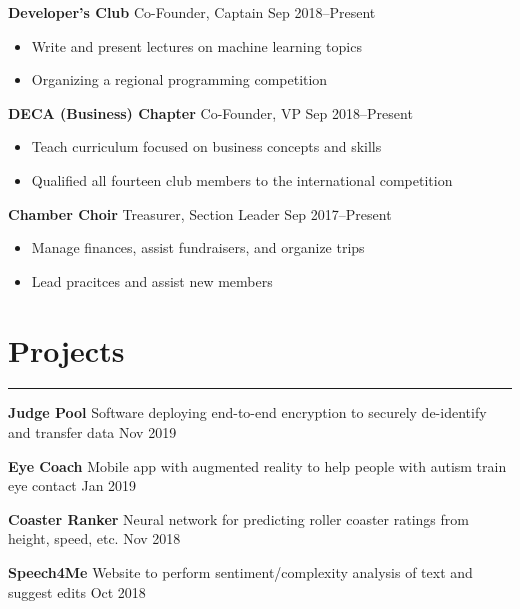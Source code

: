 \documentclass[11pt]{article}
\newcommand{\resumesection}[1]{\vspace{-0.3cm}\section*{\color{highlight}#1}\vspace{-0.3cm}\hrule\vspace{0.3cm}}
\begin{document}
\textbf{Developer's Club} Co-Founder, Captain \hfill Sep 2018--Present \par
\begin{itemize}
	\item Write and present lectures on machine learning topics
	\item Organizing a regional programming competition
\end{itemize}\vspace{0.1cm}

\textbf{DECA (Business) Chapter} Co-Founder, VP \hfill Sep 2018--Present \par
\begin{itemize}
	\item Teach curriculum focused on business concepts and skills
	\item Qualified all fourteen club members to the international competition
\end{itemize}\vspace{0.1cm}

\textbf{Chamber Choir} Treasurer, Section Leader \hfill Sep 2017--Present \par
\begin{itemize}
	\item Manage finances, assist fundraisers, and organize trips
	\item Lead pracitces and assist new members
\end{itemize}

\resumesection{Projects}


\textbf{Judge Pool} Software deploying end-to-end encryption to securely de-identify and transfer data \hfill Nov 2019 \par

\textbf{Eye Coach} Mobile app with augmented reality to help people with autism train eye contact \hfill Jan 2019 \par
\vspace{0.1cm}

\textbf{Coaster Ranker} Neural network for predicting roller coaster ratings from height, speed, etc.  \hfill Nov 2018 \par\vspace{0.1cm}

\textbf{Speech4Me} Website to perform sentiment/complexity analysis of text and suggest edits \hfill Oct 2018 \par
\vspace{0.1cm}
\end{document}
